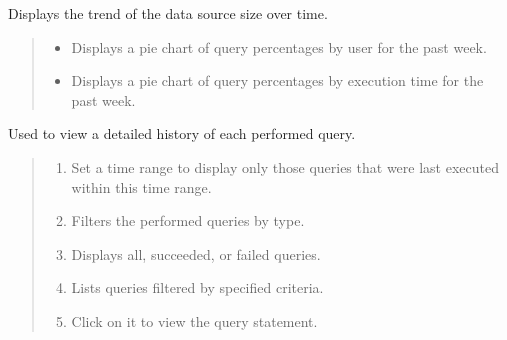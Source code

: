 \documentclass[letterpaper,10pt,english]{sphinxmanual}
\begin{document}

Displays the trend of the data source size over time.
\begin{quote}

\begin{figure}[H]
\centering

\noindent{}
\end{figure}
\end{quote}

\begin{quote}

\begin{figure}[H]
\centering

\noindent{}
\end{figure}
\begin{itemize}
\item {} 
 Displays a pie chart of query percentages by user for the past week.

\item {} 
 Displays a pie chart of query percentages by execution time for the past week.

\end{itemize}
\end{quote}


Used to view a detailed history of each performed query.
\begin{quote}

\begin{figure}[H]
\centering

\noindent{}
\end{figure}
\begin{enumerate}
\def\theenumi{\arabic{enumi}}
\def\labelenumi{\theenumi .}
\makeatletter\def\p@enumii{\p@enumi \theenumi .}\makeatother
\item {} 
 Set a time range to display only those queries that were last executed within this time range.

\item {} 
 Filters the performed queries by type.

\item {} 
 Displays all, succeeded, or failed queries.

\item {} 
 Lists queries filtered by specified criteria.

\item {} 
 Click on it to view the query statement.

\end{enumerate}
\end{quote}
\end{document}
